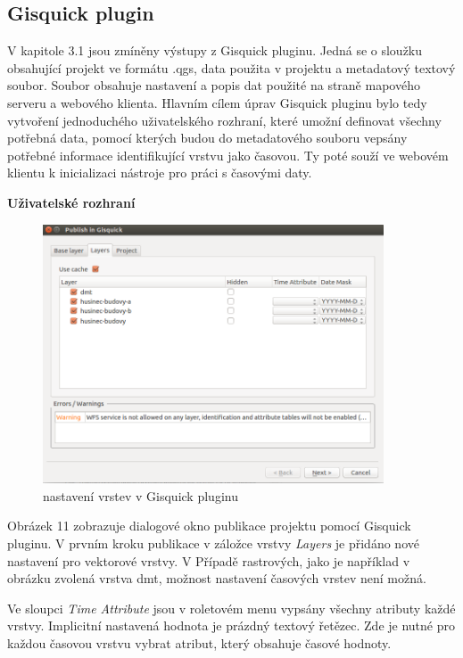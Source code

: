 \subsection{Gisquick plugin}
V kapitole 3.1 jsou zmíněny výstupy z Gisquick pluginu. Jedná se o sloužku obsahující projekt ve formátu .qgs, data použita v projektu a metadatový textový soubor. Soubor obsahuje nastavení a popis dat použité na straně mapového serveru a webového klienta. Hlavním cílem úprav Gisquick pluginu bylo tedy vytvoření jednoduchého uživatelského rozhraní, které umožní definovat všechny potřebná data, pomocí kterých budou do metadatového souboru vepsány potřebné informace identifikující vrstvu jako časovou. Ty poté souží ve webovém klientu k inicializaci nástroje pro práci s časovými daty.

\bigskip
\noindent
\textbf{Uživatelské rozhraní}

\begin{figure}[h!]
	\centering
	\includegraphics[width=0.9\textwidth]{../img/gisquick-plugin.png}
	\caption{nastavení vrstev v Gisquick pluginu}
	\label{fig:arcgis-time-settings}
\end{figure}

Obrázek 11 zobrazuje dialogové okno publikace projektu pomocí Gisquick pluginu. V prvním kroku publikace v záložce vrstvy \textit{Layers} je přidáno nové nastavení pro vektorové vrstvy. V Případě rastrových, jako je například v obrázku zvolená vrstva dmt, možnost nastavení časových vrstev není možná.

Ve sloupci \textit{Time Attribute} jsou v roletovém menu vypsány všechny atributy každé vrstvy. Implicitní nastavená hodnota je prázdný textový řetězec. Zde je nutné pro každou časovou vrstvu vybrat atribut, který obsahuje časové hodnoty. 

